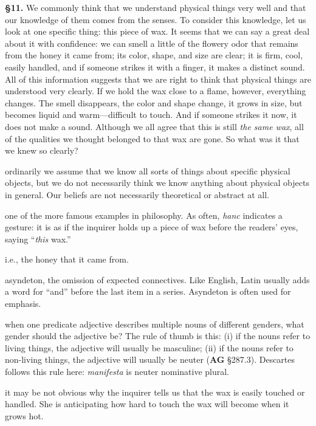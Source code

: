 \prenotes

\textbf{§11.} We commonly think that we understand physical things very well and that our knowledge of them comes from the senses. To consider this knowledge, let us look at one specific thing: this piece of wax. It seems that we can say a great deal about it with confidence: we can smell a little of the flowery odor that remains from the honey it came from; its color, shape, and size are clear; it is firm, cool, easily handled, and if someone strikes it with a finger, it makes a distinct sound. All of this information suggests that we are right to think that physical things are understood very clearly. If we hold the wax close to a flame, however, everything changes. The smell disappears, the color and shape change, it grows in size, but becomes liquid and warm---difficult to touch. And if someone strikes it now, it does not make a sound. Although we all agree that this is still \textit{the same wax}, all of the qualities we thought belonged to that wax are gone. So what was it that we knew so clearly?

 ordinarily we assume that we know all sorts of things about specific physical objects, but we do not necessarily think we know anything about physical objects in general. Our beliefs are not necessarily theoretical or abstract at all.

 one of the more famous examples in philosophy. As often, \textit{hanc} indicates a gesture: it is as if the inquirer holds up a piece of wax before the readers' eyes, saying ``\textit{this} wax.''

 i.e., the honey that it came from.

 asyndeton, the omission of expected connectives. Like English, Latin usually adds a word for ``and'' before the last item in a series. Asyndeton is often used for emphasis.

 when one predicate adjective describes multiple nouns of different genders, what gender should the adjective be? The rule of thumb is this: (i) if the nouns refer to living things, the adjective will usually be masculine; (ii) if the nouns refer to non-living things, the adjective will usually be neuter (\textbf{AG} §287.3). Descartes follows this rule here: \textit{manifesta} is neuter nominative plural.

 it may be not obvious why the inquirer tells us that the wax is easily touched or handled. She is anticipating how hard to touch the wax will become when it grows hot.

